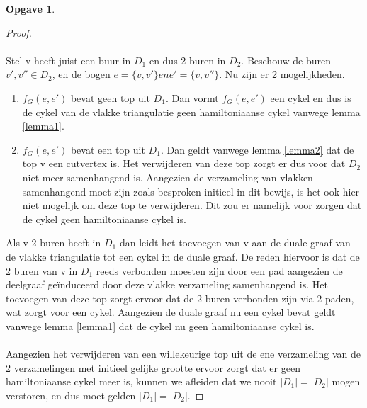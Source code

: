 \documentclass[11pt, a4paper, table]{article}
\theoremstyle{definition}
\newtheorem{opgave}{Opgave}
\theoremstyle{definition}
\theoremstyle{definition}
\begin{document}
\begin{opgave}
\begin{proof}
		\\\\Stel v heeft juist een buur in $D_1$ en dus 2 buren in $D_2$. Beschouw de buren $v', v'' \in D_2$, en de bogen $e=\{v,v'\} en e'=\{v,v''\}$. Nu zijn er 2 mogelijkheden. 
		\begin{enumerate}
			\item $f_G(e,e')$ bevat geen top uit $D_1$. Dan vormt $f_G(e,e')$ een cykel en dus is de cykel van de vlakke triangulatie geen hamiltoniaanse cykel vanwege lemma \ref{lemma1}. 
			\item $f_G(e,e')$ bevat een top uit $D_1$. Dan geldt vanwege lemma \ref{lemma2} dat de top v een cutvertex is. Het verwijderen van deze top zorgt er dus voor dat $D_2$ niet meer samenhangend is. Aangezien de verzameling van vlakken samenhangend moet zijn zoals besproken initieel in dit bewijs, is het ook hier niet mogelijk om deze top te verwijderen. Dit zou er namelijk voor zorgen dat de cykel geen hamiltoniaanse cykel is. 
		\end{enumerate}
		Als v 2 buren heeft in $D_1$ dan leidt het toevoegen van v aan de duale graaf van de vlakke triangulatie tot een cykel in de duale graaf. De reden hiervoor is dat de 2 buren van v in $D_1$ reeds verbonden moesten zijn door een pad aangezien de deelgraaf ge\"{i}nduceerd door deze vlakke verzameling samenhangend is. Het toevoegen van deze top zorgt ervoor dat de 2 buren verbonden zijn via 2 paden, wat zorgt voor een cykel. Aangezien de duale graaf nu een cykel bevat geldt vanwege lemma \ref{lemma1} dat de cykel nu geen hamiltoniaanse cykel is. 
		\\\\Aangezien het verwijderen van een willekeurige top uit de ene verzameling van de 2 verzamelingen met initieel gelijke grootte ervoor zorgt dat er geen hamiltoniaanse cykel meer is, kunnen we afleiden dat we nooit $|D_1|=|D_2|$ mogen verstoren, en dus moet gelden $|D_1|=|D_2|$.
	\end{proof}
\end{opgave}
\end{document}
